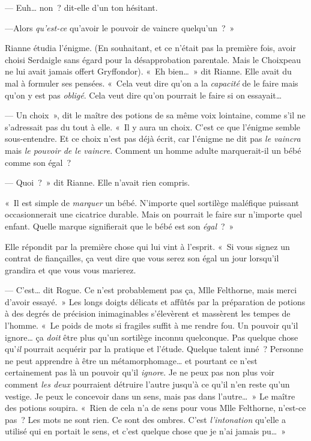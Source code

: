 --- Euh… non~? dit-elle d'un ton hésitant.

---Alors \emph{qu'est-ce} qu'avoir le pouvoir de vaincre quelqu'un~?~»

Rianne étudia l'énigme.
(En souhaitant, et ce n'était pas la première fois, avoir choisi Serdaigle sans égard pour la désapprobation parentale.
Mais le Choixpeau ne lui avait jamais offert Gryffondor).
«~Eh bien…~»
dit Rianne.
Elle avait du mal à formuler ses pensées.
«~Cela veut dire qu'on a la \emph{capacité} de le faire mais qu'on y est pas \emph{obligé}.
Cela veut dire qu'on pourrait le faire si on essayait…

--- Un choix~», dit le maître des potions de sa même voix lointaine, comme s'il ne s'adressait pas du tout à elle.
«~Il y aura un choix.
C'est ce que l'énigme semble sous-entendre.
Et ce choix n'est pas déjà écrit, car l'énigme ne dit pas \emph{le vaincra} mais \emph{le pouvoir de le vaincre}.
Comment un homme adulte marquerait-il un bébé comme son égal~?

--- Quoi~?~»
dit Rianne.
Elle n'avait rien compris.

«~Il est simple de \emph{marquer} un bébé.
N'importe quel sortilège maléfique puissant occasionnerait une cicatrice durable.
Mais on pourrait le faire sur n'importe quel enfant.
Quelle marque signifierait que le bébé est son \emph{égal}~?~»

Elle répondit par la première chose qui lui vint à l'esprit.
«~Si vous signez un contrat de fiançailles, ça veut dire que vous serez son égal un jour lorsqu'il grandira et que vous vous marierez.

--- C'est… dit Rogue.
Ce n'est probablement pas ça, Mlle Felthorne, mais merci d'avoir essayé.~»
Les longs doigts délicats et affûtés par la préparation de potions à des degrés de précision inimaginables s'élevèrent et massèrent les tempes de l'homme.
«~Le poids de mots si fragiles suffit à me rendre fou.
Un pouvoir qu'il ignore… ça \emph{doit} être plus qu'un sortilège inconnu quelconque.
Pas quelque chose qu'\emph{il} pourrait acquérir par la pratique et l'étude.
Quelque talent inné~?
Personne ne peut apprendre à être un métamorphomage… et pourtant ce n'est certainement pas là un pouvoir qu'il \emph{ignore}.
Je ne peux pas non plus voir comment \emph{les deux} pourraient détruire l'autre jusqu'à ce qu'il n'en reste qu'un vestige.
Je peux le concevoir dans un sens, mais pas dans l'autre…~»
Le maître des potions soupira.
«~Rien de cela n'a de sens pour vous Mlle Felthorne, n'est-ce pas~?
Les mots ne sont rien.
Ce sont des ombres.
C'est \emph{l'intonation} qu'elle a utilisé qui en portait le sens, et c'est quelque chose que je n'ai jamais pu…~»

